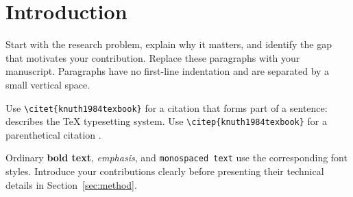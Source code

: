 \section{Introduction}
\label{sec:introduction}

Start with the research problem, explain why it matters, and identify the gap
that motivates your contribution. Replace these paragraphs with your manuscript.
Paragraphs have no first-line indentation and are separated by a small vertical
space.

Use \verb|\citet{knuth1984texbook}| for a citation that forms part of a sentence:
\citet{knuth1984texbook} describes the TeX typesetting system.
Use \verb|\citep{knuth1984texbook}| for a parenthetical citation
\citep{knuth1984texbook}.

Ordinary \textbf{bold text}, \emph{emphasis}, and \texttt{monospaced text} use
the corresponding font styles. Introduce your contributions clearly before
presenting their technical details in Section~\ref{sec:method}.
